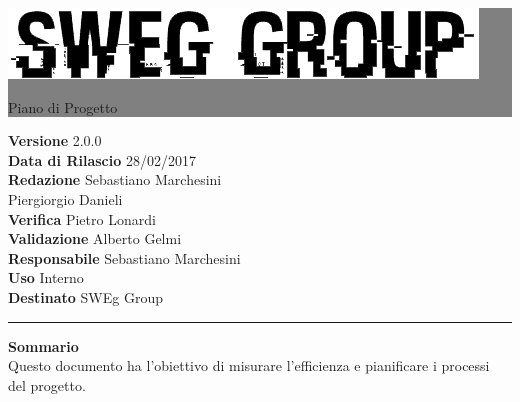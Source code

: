 \documentclass[12pt,a4paper,titlepage]{article}
\newcommand{\HRule}[1]{\hfill \rule{0.2\linewidth}{#1}} %
\begin{document}
	
	\thispagestyle{empty} %
	
	
	\colorbox{grey}{
		\parbox[t]{1.0\linewidth}{
			\centering \fontsize{50pt}{80pt}\selectfont %
			\vspace*{0.7cm} %
			
			\raggedleft
			\includegraphics[width=0.7\linewidth]{../../LogoSWEgGroupSFONDOVUOTO}
			
			\hfill Piano di Progetto \\
			
			\vspace*{0.7cm} %
		}
	}
	
	
	\vfill %
	
	
	{\centering \large 
		\hfill \textbf{Versione} 2.0.0 \\		
		\hfill \textbf{Data di Rilascio} 28/02/2017 \\ 
		\hfill \textbf{Redazione} Sebastiano Marchesini \\
		\hfill Piergiorgio Danieli \\
		\hfill \textbf{Verifica} Pietro Lonardi \\
		\hfill \textbf{Validazione} Alberto Gelmi \\
		\hfill \textbf{Responsabile} Sebastiano Marchesini \\
		\hfill \textbf{Uso} Interno \\
		\hfill \textbf{Destinato} SWEg Group \\ 
		
		\HRule{1pt}
		
		\textbf{Sommario} \\
		Questo documento ha l'obiettivo di misurare l'efficienza e pianificare i processi del progetto.
		
	} %
	
\end{document}
